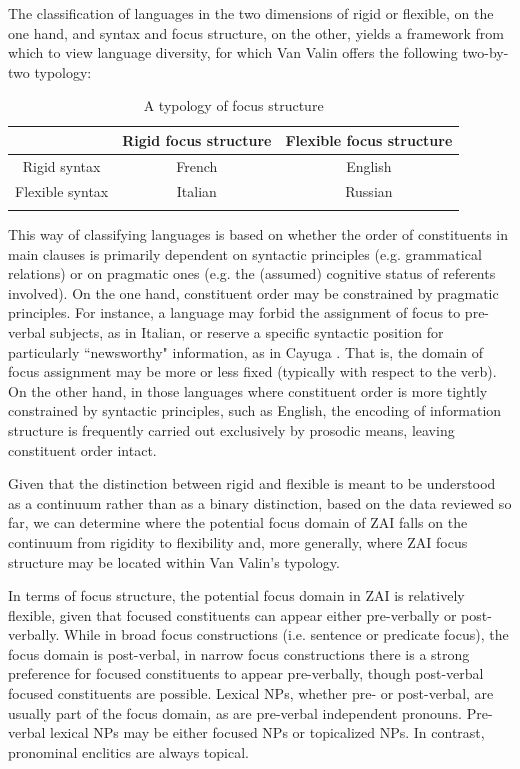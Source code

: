 The classification of languages in the two dimensions of rigid or flexible, on the one hand, and syntax and focus structure, on the other, yields a framework from which to view language diversity, for which Van Valin offers the following two-by-two typology:
\begin{table}

\caption{\small{A typology of focus structure \citep{vanvalin1999}}}
\begin{tabular}{c  c  c  |}
\lsptoprule
& Rigid focus structure & Flexible focus structure  \\

\midrule
Rigid syntax & French &  English \\

\midrule
Flexible syntax & Italian & Russian \\

\lspbottomrule
\end{tabular} 
\end{table}
This way of classifying languages is based on whether the order of constituents in main clauses is primarily dependent on syntactic principles (e.g. grammatical relations) or on pragmatic ones (e.g. the (assumed) cognitive status of referents involved). On the one hand, constituent order may be constrained by pragmatic principles. For instance, a language may forbid the assignment of focus to pre-verbal subjects, as in Italian, or reserve a specific syntactic position for particularly ``newsworthy" information, as in Cayuga \citep{mithun1992}. That is, the domain of focus assignment may be more or less fixed (typically with respect to the verb). On the other hand, in those languages where constituent order is more tightly constrained by syntactic principles, such as English, the encoding of information structure is frequently carried out exclusively by prosodic means, leaving constituent order intact.

Given that the distinction between rigid and flexible is meant to be understood as a continuum rather than as a binary distinction, based on the data reviewed so far, we can determine where the potential focus domain of ZAI falls on the continuum from rigidity to flexibility and, more generally, where ZAI focus structure may be located within Van Valin's typology.

In terms of focus structure, the potential focus domain in ZAI is relatively flexible, given that focused constituents can appear either pre-verbally or post-verbally. While in broad focus constructions (i.e. sentence or predicate focus), the focus domain is post-verbal, in narrow focus constructions there is a strong preference for focused constituents to appear pre-verbally, though post-verbal focused constituents are possible. Lexical NPs, whether pre- or post-verbal, are usually part of the focus domain, as are pre-verbal independent pronouns. Pre-verbal lexical NPs may be either focused NPs or topicalized NPs. In contrast, pronominal enclitics are always topical. 

